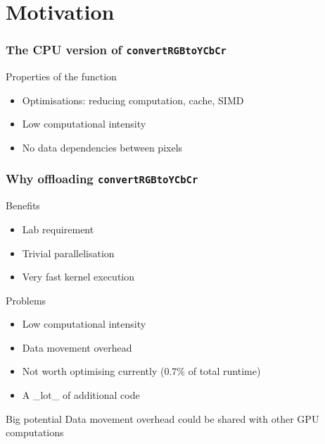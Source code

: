 \section{Motivation}
\begin{frame}[fragile]
  \frametitle{The CPU version of \lstinline{convertRGBtoYCbCr}}
   \pause
  \begin{alertblock}{Properties of the function}
    \begin{itemize}
    \item Optimisations: reducing computation, cache, SIMD
    \item Low computational intensity
    \item No data dependencies between pixels
    \end{itemize}
  \end{alertblock}
\end{frame}

\begin{frame}
  \frametitle{Why offloading \lstinline{convertRGBtoYCbCr}}
  \begin{block}{Benefits}
    \begin{itemize}
    \item Lab requirement
    \item Trivial parallelisation
    \item Very fast kernel execution
    \end{itemize}
  \end{block}
  \pause
  \begin{block}{Problems}
    \begin{itemize}
    \item Low computational intensity
    \item Data movement overhead
    \item Not worth optimising currently (\(0.7\%\) of total runtime)
    \item A \_lot\_ of additional code
    \end{itemize}
  \end{block}
  \pause
  \begin{alertblock}{Big potential}
    Data movement overhead could be shared with other GPU computations
  \end{alertblock}
\end{frame}

